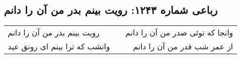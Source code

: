 \begin{center}
\section*{رباعی شماره ۱۲۴۳: رویت بینم بدر من آن را دانم}
\label{sec:1243}
\begin{longtable}{l p{0.5cm} r}
رویت بینم بدر من آن را دانم
&&
وانجا که توئی صدر من آن را دانم
\\
وانشب که ترا بینم ای رونق عید
&&
از عمر شب قدر من آن را دانم
\\
\end{longtable}
\end{center}
